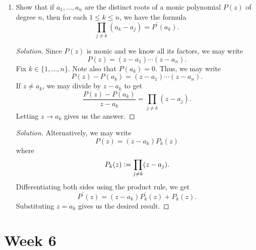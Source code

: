 \documentclass[11pt]{article}
\theoremstyle{definition}
\newenvironment{soln}{\begin{proof}[Solution]}{\end{proof}}
\begin{document}
\begin{enumerate}[leftmargin=*]
    \item Show that if $a_1, \ldots, a_n$ are the distinct roots of a monic polynomial $P(z)$ of degree $n$, then for each $1 \leq k \leq n$, we have the formula
    \[
        \prod_{j \neq k} (a_k - a_j) = P^{\prime}(a_k).
    \]
    
    \begin{soln}
        Since $P(z)$ is monic and we know all its factors, we may write
        \[
            P(z) = (z-a_1)\cdots (z-a_n).
        \]  
        Fix $k \in \{1,\ldots,n\}$. Note also that $P(a_k) = 0$. Thus, we may write
        \[
            P(z) - P(a_k) = (z-a_1)\cdots(z-a_n).
        \]
        If $z \neq a_k$, we may divide by $z-a_k$ to get
        \[
            \frac{P(z) - P(a_k)}{z-a_k} = \prod_{j \neq k} (z-a_j).
        \]
        Letting $z \to a_k$ gives us the answer.
    \end{soln}
    
    \begin{soln}
        Alternatively, we may write
        \[
            P(z) = (z-a_k) P_k(z)
        \]
        where
        \[
            P_k(z) \vcentcolon= \prod_{j \neq k} (z-a_j).
        \]
        Differentiating both sides using the product rule, we get
        \[
            P^{\prime}(z) = (z-a_k) P_k^{\prime}(z) + P_k(z).
        \]
        Substituting $z = a_k$ gives us the desired result.
    \end{soln}
\end{enumerate}

\newpage

\section{Week 6}
\end{document}
